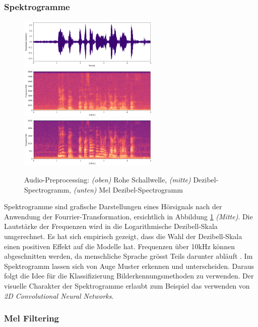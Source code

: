 \subsubsection{Spektrogramme} 
\begin{figure}[hbt]
	\centering
		\includegraphics[width=0.6\textwidth]{assets/audio_raw.png}
		\includegraphics[width=0.6\textwidth]{assets/audio_log.png}
		\includegraphics[width=0.6\textwidth]{assets/audio_mel.png}
	\centering
	\caption{Audio-Preprocessing: \textit{(oben)} Rohe Schallwelle, \textit{(mitte)}
		     Dezibel-Spectrogramm, 
		     \textit{(unten)} Mel Dezibel-Spectrogramm}
	\label{img:preprocessing}
\end{figure}
Spektrogramme sind grafische Darstellungen eines Hörsignals nach der Anwendung der Fourrier-Transformation\parencite[]['Spectrograms']{fourrier}, ersichtlich in Abbildung \ref{img:preprocessing} \textit{(Mitte)}. Die Lautstärke der Frequenzen wird in die Logarithmische Dezibell-Skala umgerechnet. Es hat sich empirisch gezeigt, dass die Wahl der Dezibell-Skala einen positiven Effekt auf die Modelle hat. Frequenzen über 10kHz können abgeschnitten werden, da menschliche Sprache grösst Teils darunter abläuft \parencite{tenkHz}. Im Spektrogramm lassen sich von Auge Muster erkennen und unterscheiden. Daraus folgt die Idee für die Klassifizierung Bilderkennungsmethoden zu verwenden. Der visuelle Charakter der Spektrogramme erlaubt zum Beispiel das verwenden von \textit{2D Convolutional Neural Networks}.

\subsubsection{Mel Filtering} 

